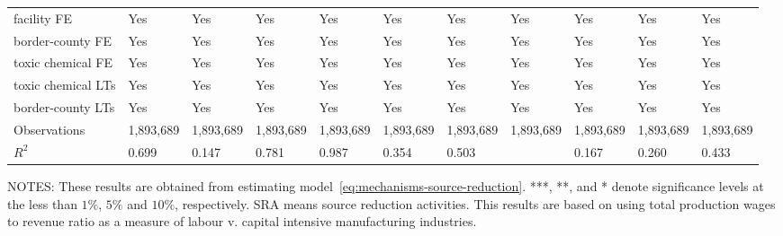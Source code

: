 \begin{table}[H]
{\begin{tabular}{@{}lllllllllll@{}}
            facility FE           & Yes       & Yes             & Yes        & Yes                   & Yes            & Yes       & Yes                   & Yes                 & Yes                   & Yes                 \\
            border-county FE      & Yes       & Yes             & Yes        & Yes                   & Yes            & Yes       & Yes                   & Yes                 & Yes                   & Yes                 \\
            toxic chemical FE     & Yes       & Yes             & Yes        & Yes                   & Yes            & Yes       & Yes                   & Yes                 & Yes                   & Yes                 \\
            toxic chemical LTs    & Yes       & Yes             & Yes        & Yes                   & Yes            & Yes       & Yes                   & Yes                 & Yes                   & Yes                 \\
            border-county LTs     & Yes       & Yes             & Yes        & Yes                   & Yes            & Yes       & Yes                   & Yes                 & Yes                   & Yes                 \\\midrule
            Observations          & 1,893,689 & 1,893,689       & 1,893,689  & 1,893,689             & 1,893,689      & 1,893,689 & 1,893,689             & 1,893,689           & 1,893,689             & 1,893,689           \\
            $R^2$                 & 0.699     & 0.147           & 0.781      & 0.987                 & 0.354          & 0.503     &                       & 0.167               & 0.260                 & 0.433               \\ \bottomrule \bottomrule
        \end{tabular}%
    }
    \begin{minipage}{\columnwidth}
        \vspace{0.05in}
        \tiny NOTES: These results are obtained from estimating model~\ref{eq:mechanisms-source-reduction}. ***, **, and * denote significance levels at the less than $1\%$, $5\%$ and $10\%$, respectively. SRA means source reduction activities. This results are based on using total production wages to revenue ratio as a measure of labour v. capital intensive manufacturing industries.
    \end{minipage}
\end{table}